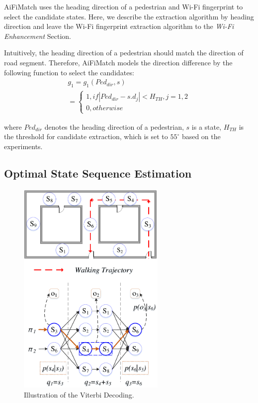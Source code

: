 \documentclass[conference]{IEEEtran}
\begin{document}
AiFiMatch uses the heading direction of a pedestrian and Wi-Fi fingerprint to select the candidate states. Here, we describe the extraction algorithm by heading direction and leave the Wi-Fi fingerprint extraction algorithm to the \emph{Wi-Fi Enhancement} Section.

Intuitively, the heading direction of a pedestrian should match the direction of road segment. Therefore, AiFiMatch models the direction difference by the following function to select the candidates:
\begin{equation}
\begin{array}{l}
{g_1} = {g_1}(Pe{d_{dir}},s)\\
= \left\{ {\begin{array}{*{20}{l}}
	{1,if\left| {Pe{d_{dir}} - s.{d_j}} \right| < {H_{TH}},j = 1,2}\\
	{0,otherwise}
	\end{array}} \right.
\end{array}
\end{equation}

where $Ped_{dir}$ denotes the heading direction of a pedestrian, $s$ is a state, $H_{TH}$ is the threshold for candidate extraction, which is set to $55^\circ$ based on the experiments.

\subsection{Optimal State Sequence Estimation}

\begin{figure}[!htbp]
	\centering
	\includegraphics[width=2.8in]{AiFiMatch-Viterbi}
	\caption{Illustration of the Viterbi Decoding.}
	\label{fig-viterbi}
\end{figure}
\end{document}
